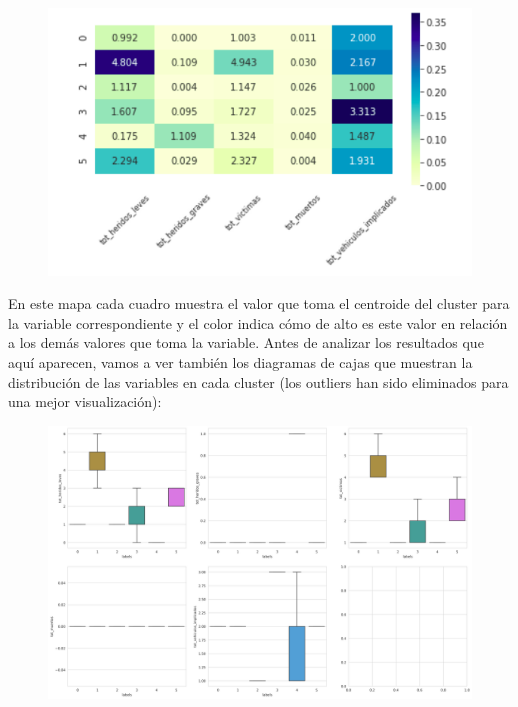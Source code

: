 \documentclass[a4paper,11pt]{book}
\begin{document}
\begin{figure}[h]
	\centering
	\includegraphics[width=1\linewidth]{img/heatmap1}
	\caption{}
	\label{fig:heatmap1}
\end{figure}

En este mapa cada cuadro muestra el valor que toma el centroide del cluster para la variable correspondiente y el color indica cómo de alto es este valor en relación a los demás valores que toma la variable. Antes de analizar los resultados que aquí aparecen, vamos a ver también los diagramas de cajas que muestran la distribución de las variables en cada cluster (los outliers han sido eliminados para una mejor visualización):
\vspace{8cm}
\begin{figure}[h]
	\centering
	\includegraphics[width=1.1\linewidth]{img/cajas_cluster1}
	\caption{}
	\label{fig:cajascluster1}
\end{figure}
\end{document}
